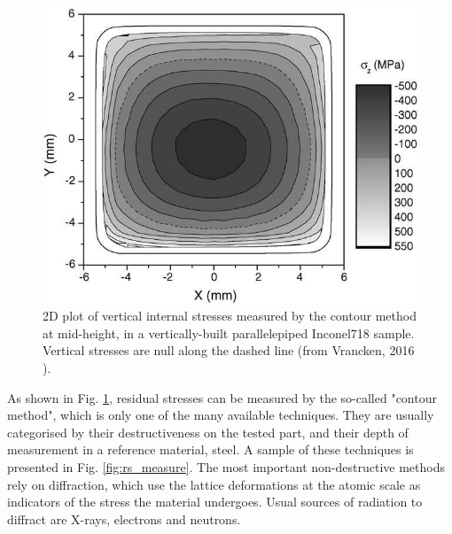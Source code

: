 \begin{figure}[ht]
	\centering
	\includegraphics[scale=0.50]{Images/rs_section}
	\decoRule
	\caption[2D plot of vertical internal stresses measured by the contour method at mid-height, in a vertically-built parallelipiped Inconel718 sample. Vertical stresses are null along the dashed line.]{2D plot of vertical internal stresses measured by the contour method at mid-height, in a vertically-built parallelepiped Inconel718 sample. Vertical stresses are null along the dashed line (from Vrancken, 2016 \parencite{Vrancken2016}).}
	\label{fig:rs_section}
\end{figure}

As shown in Fig. \ref{fig:rs_section}, residual stresses can be measured by the so-called "contour method", which is only one of the many available techniques. They are usually categorised by their destructiveness on the tested part, and their depth of measurement in a reference material, steel. A sample of these techniques is presented in Fig. \ref{fig:rs_measure}. The most important non-destructive methods rely on diffraction, which use the lattice deformations at the atomic scale as indicators of the stress the material undergoes. Usual sources of radiation to diffract are X-rays, electrons and neutrons.\\

